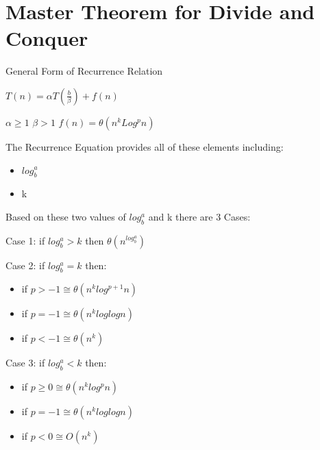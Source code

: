 \documentclass[a4paper,12pt]{article}
\begin{document}
\section*{Master Theorem for Divide and Conquer  }







General Form of Recurrence Relation

\vspace{5mm}

$T(n) = \alpha T(\frac{b}{\beta}) + f(n)$

\vspace{5mm}
$\alpha \geq 1$  
$\beta > 1$   $f(n) = \theta(n^kLog^pn)$

\vspace{5mm}

The Recurrence Equation provides all of these elements including: 

\begin{itemize}

	\item $log^a_b$
	\item k
\end{itemize}

Based on these two values of $log^a_b$ and k there are 3 Cases:

\vspace{5mm}
Case 1: if $log^a_b > k$ then $\theta(n^{log^a_b})$

\vspace{5mm}
Case 2:  if $log^a_b = k$ then:
	\begin{itemize}
		\item if $p > -1 \cong \theta(n^klog^{p+1}n)$
		\item if $p =-1 \cong \theta(n^{k}loglogn)$
		\item if $p < -1 \cong \theta(n^{k})$
	\end{itemize}
	
\vspace{5mm}
Case 3: if $log^a_b < k$ then:
	\begin{itemize}
		\item if $p \geq 0 \cong \theta(n^klog^{p}n)$
		\item if $p =-1 \cong \theta(n^{k}loglogn)$
		\item if $p < 0 \cong O(n^{k})$
	\end{itemize}
\end{document}
